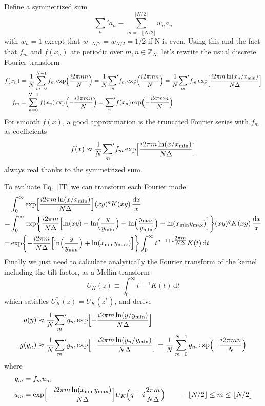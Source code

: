 \documentclass{article}
\renewcommand{\d}{\mathrm{d}}
\newcommand{\xmin}{x_\mathrm{min}}
\newcommand{\ymin}{y_\mathrm{min}}
\newcommand{\ymax}{y_\mathrm{max}}
\newcommand{\Nhalf}{\lfloor N/2\rfloor}
\newcommand{\Mellin}{U}
\begin{document}
Define a symmetrized sum
\begin{equation}
    {\sum_n}' a_n \equiv \sum_{m=-\Nhalf}^{\Nhalf} w_n a_n
\end{equation}
with $w_n=1$ except that $w_{-N/2}=w_{N/2}=1/2$ if N is even.
Using this and the fact that $f_m$ and $f(x_n)$ are periodic over $m,n\in\mathbb{Z}_N$,
let's rewrite the usual discrete Fourier transform
\begin{align}
    f(x_n) &= \frac1N \sum_{m=0}^{N-1} f_m \exp\Bigl(\frac{i2\pi mn}N\Bigr)
    = \frac1N {\sum_m}' f_m \exp\Bigl(\frac{i2\pi mn}N\Bigr)
    = \frac1N {\sum_m}' f_m \exp\Bigl[\frac{i2\pi m\ln(x_n/\xmin)}{N\Delta}\Bigr] \\
    \label{step1}
    f_m &= \sum_{n=0}^{N-1} f(x_n) \exp\Bigl(-\frac{i2\pi mn}N\Bigr)
    = {\sum_n}' f(x_n) \exp\Bigl(-\frac{i2\pi mn}N\Bigr)
\end{align}
For smooth $f(x)$, a good approximation is the truncated Fourier series
with $f_m$ as coefficients
\begin{equation}
    f(x) \approx \frac1N {\sum_m}' f_m \exp\Bigl[\frac{i2\pi m\ln(x/\xmin)}{N\Delta}\Bigr]
\end{equation}
always real thanks to the symmetrized sum.

To evaluate Eq.~\eqref{IT} we can transform each Fourier mode
\begin{align}
    &\int_0^\infty \exp\Bigl[\frac{i2\pi m\ln(x/\xmin)}{N\Delta}\Bigr]
        (xy)^q K(xy) \,\frac{\d x}x \\
    = &\int_0^\infty \exp\biggl\{\frac{i2\pi m}{N\Delta}
        \Bigl[\ln(xy)-\ln\Bigl(\frac{y}{\ymin}\Bigr)
            +\ln\Bigl(\frac{\ymax}{\ymin}\Bigr)-\ln(\xmin\ymax)\Bigr]
    \biggr\} (xy)^q K(xy) \,\frac{\d x}x \\
    = &\exp\biggl\{-\frac{i2\pi m}{N\Delta}
        \Bigl[\ln\Bigl(\frac{y}{\ymin}\Bigr)+\ln(\xmin\ymax)\Bigr]
    \biggr\} \int_0^\infty t^{q-1+i\tfrac{2\pi m}{N\Delta}} K(t) \,\d t
\end{align}
Finally we just need to calculate analytically
the Fourier transform of the kernel including the tilt factor,
as a Mellin transform
\begin{equation}
    \label{Mellin}
    \Mellin_K(z) \equiv \int_0^\infty t^{z-1} K(t) \,\d t
\end{equation}
which satisfies $\Mellin_K^*(z)=\Mellin_K(z^*)$, and derive
\begin{align}
    g(y) &\approx \frac1N {\sum_m}' g_m \exp\Bigl[-\frac{i2\pi m\ln(y/\ymin)}{N\Delta}\Bigr] \\
    \label{step6}
    g(y_n) &\approx \frac1N {\sum_m}' g_m \exp\Bigl[-\frac{i2\pi m\ln(y_n/\ymin)}{N\Delta}\Bigr]
    = \frac1N \sum_{m=0}^{N-1} g_m \exp\Bigl(-\frac{i2\pi mn}N\Bigr)
\end{align}
where
\begin{align}
    \label{step5}
    g_m &= f_m u_m \\
    \label{step4}
    u_m &= \exp\Bigl[-\frac{i2\pi m\ln(\xmin\ymax)}{N\Delta}\Bigr]
    \Mellin_K\Bigl(q+i\frac{2\pi m}{N\Delta}\Bigr) \qquad -\Nhalf\leq m\leq\Nhalf
\end{align}
\end{document}
